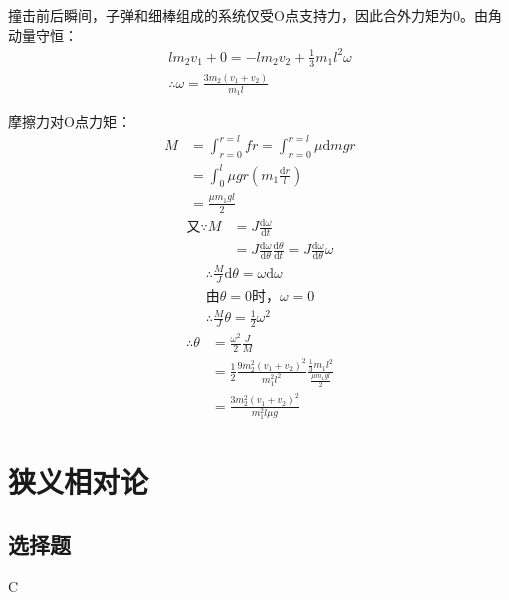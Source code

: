 \documentclass[b5paper,opensource,sourcefont,parskip]{qyxf-book}
\newcommand{\di}[1]{\mathrm{d}#1}
\newcommand{\dy}[2]{\frac{\di{#1}}{\di{#2}}}
\begin{document}
撞击前后瞬间，子弹和细棒组成的系统仅受O点支持力，因此合外力矩为0。由角动量守恒：
\begin{gather*}
lm_2v_1+0=-lm_2v_2+\frac{1}{3}m_1l^2\omega\\
\therefore \omega=\frac{3m_2(v_1+v_2)}{m_1l}
\end{gather*}\par
摩擦力对O点力矩：
\begin{align*}
M	&=\int_{r=0}^{r=l}fr=\int_{r=0}^{r=l}\mu \di{m}gr\\
&=\int_0^l\mu gr\left(m_1\frac{\di{r}}{l}\right)\\
&=\frac{\mu m_1gl}{2}
\end{align*}
\begin{align*}
\text{又}\because M&=J\dy{\omega}{t}\\
&=J\dy{\omega}{\theta}\dy{\theta}{t}=J\dy{\omega}{\theta}\omega
\end{align*}
\begin{gather*}
\therefore \frac{M}{J}\di{\theta}=\omega\di{\omega}\\
\text{由}\theta=0\text{时}，\omega=0\\
\therefore \frac{M}{J}\theta=\frac{1}{2}\omega^2
\end{gather*}
\begin{align*}
\therefore \theta&=\frac{\omega^2}{2}\frac{J}{M}\\
&=\frac{1}{2}\frac{9m_2^2(v_1+v_2)^2}{m_1^2l^2}\frac{\frac{1}{3}m_1l^2}{\frac{\mu m_1gl}{2}}\\
&=\frac{3m_2^2(v_1+v_2)^2}{m_1^2l\mu g}
\end{align*}

\chapter{狭义相对论}  %
\section{选择题}  %

C  %
\end{document}
